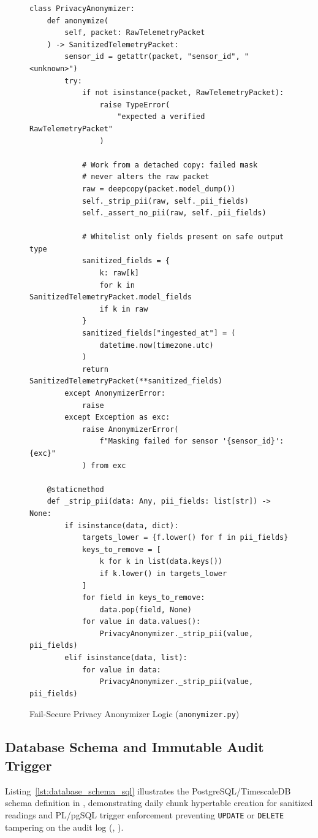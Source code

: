 \documentclass[a4paper]{article}
\begin{document}
\begin{figure}[H]
\centering
\begin{minipage}{0.95\linewidth}
\begin{Verbatim}[fontsize=\scriptsize,breaklines=true]
class PrivacyAnonymizer:
    def anonymize(
        self, packet: RawTelemetryPacket
    ) -> SanitizedTelemetryPacket:
        sensor_id = getattr(packet, "sensor_id", "<unknown>")
        try:
            if not isinstance(packet, RawTelemetryPacket):
                raise TypeError(
                    "expected a verified RawTelemetryPacket"
                )

            # Work from a detached copy: failed mask
            # never alters the raw packet
            raw = deepcopy(packet.model_dump())
            self._strip_pii(raw, self._pii_fields)
            self._assert_no_pii(raw, self._pii_fields)

            # Whitelist only fields present on safe output type
            sanitized_fields = {
                k: raw[k]
                for k in SanitizedTelemetryPacket.model_fields
                if k in raw
            }
            sanitized_fields["ingested_at"] = (
                datetime.now(timezone.utc)
            )
            return SanitizedTelemetryPacket(**sanitized_fields)
        except AnonymizerError:
            raise
        except Exception as exc:
            raise AnonymizerError(
                f"Masking failed for sensor '{sensor_id}': {exc}"
            ) from exc

    @staticmethod
    def _strip_pii(data: Any, pii_fields: list[str]) -> None:
        if isinstance(data, dict):
            targets_lower = {f.lower() for f in pii_fields}
            keys_to_remove = [
                k for k in list(data.keys())
                if k.lower() in targets_lower
            ]
            for field in keys_to_remove:
                data.pop(field, None)
            for value in data.values():
                PrivacyAnonymizer._strip_pii(value, pii_fields)
        elif isinstance(data, list):
            for value in data:
                PrivacyAnonymizer._strip_pii(value, pii_fields)
\end{Verbatim}
\end{minipage}
\caption{Fail-Secure Privacy Anonymizer Logic (\texttt{anonymizer.py})}
\label{lst:anonymizer_impl}
\end{figure}

\clearpage
\subsection{Database Schema and Immutable Audit Trigger}
Listing~\ref{lst:database_schema_sql} illustrates the PostgreSQL/TimescaleDB schema definition in , demonstrating daily chunk hypertable creation for sanitized readings and PL/pgSQL trigger enforcement preventing \texttt{UPDATE} or \texttt{DELETE} tampering on the audit log (, ).
\end{document}

